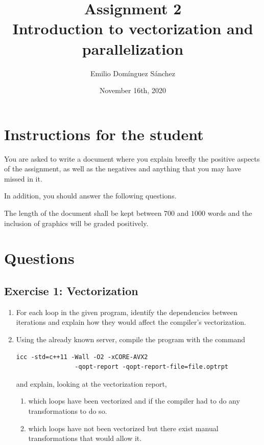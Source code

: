 \documentclass[
    12pt, %
]{fphw}
\title{Assignment 2 \\
Introduction to vectorization and parallelization} %
\author{Emilio Domínguez Sánchez} %
\date{November 16th, 2020} %
\institute{University of Murcia \\ Faculty of Informatics} %
\begin{document}
\maketitle %


\section*{Instructions for the student}

    You are asked to write a document where you
explain breefly the positive aspects of the assignment,
as well as the negatives and
anything that you may have missed in it.

\noindent
In addition, you should answer the following questions.

\noindent
The length of the document shall be kept between $700$ and $1000$ words and
the inclusion of graphics will be graded positively.

\section*{Questions}

\subsection*{Exercise 1: Vectorization}

\begin{enumerate}
    \item For each loop in the given program,
    identify the dependencies between iterations and explain how they would
    affect the compiler's vectorization.

    \item Using the already known server, compile the program with the command

    \begin{lstlisting}[gobble=8]
        icc -std=c++11 -Wall -O2 -xCORE-AVX2
                -qopt-report -qopt-report-file=file.optrpt
    \end{lstlisting}

    and explain, looking at the vectorization report,

    \begin{enumerate}
        \item which loops have been vectorized and
        if the compiler had to do any transformations to do so.

        \item which loops have not been vectorized but there exist manual transformations that would allow it.
    \end{enumerate}
\end{enumerate}
\end{document}
